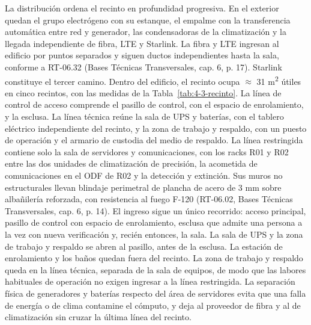 La distribución ordena el recinto en profundidad progresiva. En el exterior quedan el grupo electrógeno con su estanque, el empalme con la transferencia automática entre red y generador, las condensadoras de la climatización y la llegada independiente de fibra, LTE y Starlink. La fibra y LTE ingresan al edificio por puntos separados y siguen ductos independientes hasta la sala, conforme a RT-06.32 (Bases Técnicas Transversales, cap. 6, p. 17). Starlink constituye el tercer camino. Dentro del edificio, el recinto ocupa $\approx$ 31 m\textsuperscript{2} útiles en cinco recintos, con las medidas de la Tabla~\ref{tab:4-3-recinto}. La línea de control de acceso comprende el pasillo de control, con el espacio de enrolamiento, y la esclusa. La línea técnica reúne la sala de UPS y baterías, con el tablero eléctrico independiente del recinto, y la zona de trabajo y respaldo, con un puesto de operación y el armario de custodia del medio de respaldo. La línea restringida contiene solo la sala de servidores y comunicaciones, con los racks R01 y R02 entre las dos unidades de climatización de precisión, la acometida de comunicaciones en el ODF de R02 y la detección y extinción. Sus muros no estructurales llevan blindaje perimetral de plancha de acero de 3 mm sobre albañilería reforzada, con resistencia al fuego F-120 (RT-06.02, Bases Técnicas Transversales, cap. 6, p. 14). El ingreso sigue un único recorrido: acceso principal, pasillo de control con espacio de enrolamiento, esclusa que admite una persona a la vez con nueva verificación y, recién entonces, la sala. La sala de UPS y la zona de trabajo y respaldo se abren al pasillo, antes de la esclusa. La estación de enrolamiento y los baños quedan fuera del recinto. La zona de trabajo y respaldo queda en la línea técnica, separada de la sala de equipos, de modo que las labores habituales de operación no exigen ingresar a la línea restringida. La separación física de generadores y baterías respecto del área de servidores evita que una falla de energía o de clima contamine el cómputo, y deja al proveedor de fibra y al de climatización sin cruzar la última línea del recinto.

